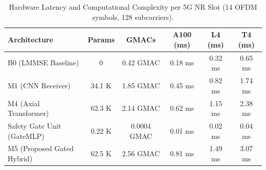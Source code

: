 \begin{table}[t]
\centering
\caption{Hardware Latency and Computational Complexity per 5G NR Slot (14 OFDM symbols, 128 subcarriers).}
\label{tab:complexity_latency}
\begin{tabular}{lccccc}
\hline
\textbf{Architecture} & \textbf{Params} & \textbf{GMACs} & \textbf{A100 (ms)} & \textbf{L4 (ms)} & \textbf{T4 (ms)} \\
\hline
B0 (LMMSE Baseline) & 0 & 0.42 GMAC & 0.18 ms & 0.32 ms & 0.65 ms \\
M1 (CNN Receiver) & 34.1 K & 1.85 GMAC & 0.45 ms & 0.82 ms & 1.74 ms \\
M4 (Axial Transformer) & 62.3 K & 2.14 GMAC & 0.62 ms & 1.15 ms & 2.38 ms \\
Safety Gate Unit (GateMLP) & 0.22 K & 0.0004 GMAC & 0.01 ms & 0.02 ms & 0.04 ms \\
M5 (Proposed Gated Hybrid) & 62.5 K & 2.56 GMAC & 0.81 ms & 1.49 ms & 3.07 ms \\
\hline
\end{tabular}
\end{table}
